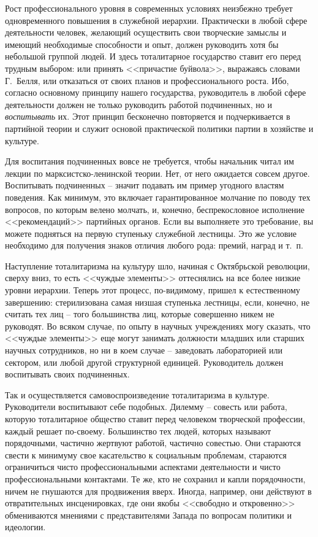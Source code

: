 \documentclass{book}
\begin{document}
Рост профессионального уровня в современных условиях неизбежно требует одновременного повышения в служебной иерархии. Практически в любой сфере деятельности человек, желающий осуществить свои творческие замыслы и имеющий необходимые способности и опыт, должен руководить хотя бы небольшой группой людей. И здесь тоталитарное государство ставит его перед трудным выбором: или принять <<причастие буйвола>>, выражаясь словами Г.~Белля, или отказаться от своих планов и профессионального роста. Ибо, согласно основному принципу нашего государства, руководитель в любой сфере деятельности должен не только руководить работой подчиненных, но и \textit{воспитывать} их. Этот принцип бесконечно повторяется и подчеркивается в партийной теории и служит основой практической политики партии в хозяйстве и культуре.

Для воспитания подчиненных вовсе не требуется, чтобы начальник читал им лекции по марксистско-ленинской теории. Нет, от него ожидается совсем другое. Воспитывать подчиненных -- значит подавать им пример угодного властям поведения. Как минимум, это включает гарантированное молчание по пово­ду тех вопросов, по которым велено молчать, и, конечно, беспрекословное исполнение <<рекомендаций>> партийных органов. Если вы выполняете это требование, вы можете подняться на первую ступеньку служебной лестницы. Это же условие необходимо для получения знаков отличия любого рода: премий, наград и т.~п.

Наступление тоталитаризма на культуру шло, начиная с Октябрьской революции, сверху вниз, то есть <<чуждые элементы>> оттеснялись на все более низкие уровни иерархии. Теперь этот процесс, по-видимому, пришел к естественному завершению: стерилизована самая низшая ступенька лестницы, если, конечно, не считать тех лиц -- того большинства лиц, которые совершенно никем не руководят. Во всяком случае, по опыту в научных учреждениях могу сказать, что <<чуждые элементы>> еще могут занимать должности младших или старших научных сотрудников, но ни в коем случае -- заведовать лабораторией или сектором, или любой другой структурной единицей. Руководитель должен воспитывать своих подчиненных.

Так и осуществляется самовоспроизведение тоталитаризма в культуре. Руководители воспитывают себе подобных.
Дилемму -- совесть или работа, которую тоталитарное общество ставит перед человеком творческой профессии, каждый решает по-своему. Большинство тех людей, которых называют порядочными, частично жертвуют работой, частично совестью. Они стараются свести к минимуму свое касательство к социальным проблемам, стараются ограничиться чисто профессиональными аспектами деятельности и чисто профессиональными контактами. Те же, кто не сохранил и капли порядочности, ничем не гнушаются для продвижения вверх. Иногда, например, они действуют в отвратительных инсценировках, где они якобы <<свободно и откровенно>> обмениваются мнениями с представителями Запада по вопросам политики и идеологии.
\end{document}

